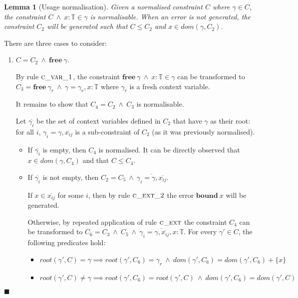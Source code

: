 \documentclass[preprint]{sigplanconf}
\newtheorem{lem}{Lemma}
\newcommand{\cand}{\:\wedge\:}
\newcommand{\free}[1]{\mathbf{free}\:#1}
\newcommand{\tinf}{\mathbb{T}}
\newcommand{\qed}{$\blacksquare$}
\newenvironment{proof}{\vspace{1ex}\noindent{\bf Proof}\hspace{0.5em}}
  {\hfill\qed\vspace{1ex}}
\begin{document}
\begin{lem}[Usage normalisation]
\label{lem:norm_usage}
Given a normalised constraint $C$ where $\gamma \in C$, the constraint 
$C \cand x : \tinf \in \gamma$ is normalisable. When an error is not generated, 
the constraint $C_2$ will be generated such that $C \leq C_2$ and
$x \in dom(\gamma, C_2)$.
\end{lem}
\begin{proof}

There are three cases to consider:

\begin{enumerate}
\item $C = C_2 \cand \free{\gamma}$.

By rule $\textsc{c\_var\_1}$, the constraint
$\free{\gamma} \cand x : \tinf \in \gamma$ can be transformed to 
$C_3 = \free{\gamma_r} \cand \gamma = \gamma_r, x : \tinf$ where
$\gamma_r$ is a fresh context variable.

It remains to show that $C_4 = C_2 \cand C_3$ is normalisable.

Let $\overline{\gamma_i}$ be the set of context variables defined in
$C_2$ that have $\gamma$ as their root: for all $i$, $\gamma_i = \gamma, \overline{x_{ij}}$ is
a sub-constraint of $C_2$ (as it was previously normalised).

\begin{itemize}
\item If $\overline{\gamma_i}$ is empty, then $C_4$ is normalised.
It can be directly observed that $x \in dom(\gamma, C_4)$ and that
$C \leq C_4$.

\item If $\overline{\gamma_i}$ is not empty, then
$C_2 = C_5 \cand \overline{\gamma_i = \gamma, \overline{x_{ij}}}$.

If $x \in \overline{x_{ij}}$ for some $i$, then by rule $\textsc{c\_ext\_2}$
the error $\mathbf{bound}\:x$ will be generated.

Otherwise, by repeated application of rule $\textsc{c\_ext}$ the constraint
$C_4$ can be transformed to $C_6 = C_3 \cand C_5 \cand \overline{\gamma_i = \gamma, \overline{x_{ij}}, x : \tinf}$. For every $\gamma' \in C$, 
the following predicates hold:
\begin{itemize}
\item $root(\gamma', C) = \gamma \implies root(\gamma', C_6) = \gamma_r \cand dom(\gamma', C_6) = dom(\gamma', C_6) + \{x\}$
\item $root(\gamma', C) \neq \gamma \implies root(\gamma', C_6) = root(\gamma', C) \cand dom(\gamma', C_6) = dom(\gamma', C)$
\end{itemize}


\end{itemize}
\end{enumerate}
\end{proof}
\end{document}
